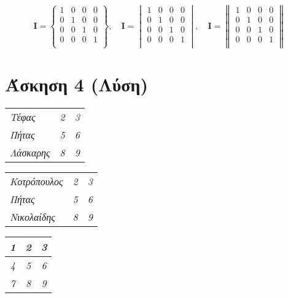 \documentclass[a4paper,11pt]{article}
\begin{document}
	\quad
	
	\begin{equation}
	\textbf{I} =
	\begin{Bmatrix} 
	1&0&0&0 \\
	0&1&0&0 \\
	0&0&1&0 \\
	0&0&0&1 \\
	\end{Bmatrix},\quad
	\textbf{I} =
	\begin{vmatrix} 
	1&0&0&0 \\
	0&1&0&0 \\
	0&0&1&0 \\
	0&0&0&1 \\
	\end{vmatrix},\quad
	\textbf{I} =
	\begin{Vmatrix} 
	1&0&0&0 \\
	0&1&0&0 \\
	0&0&1&0 \\
	0&0&0&1 \\
	\end{Vmatrix}
	\end{equation}

\vspace{20pt}

\section{Άσκηση 4 (Λύση)}
		
	\begin{table}[!h]
	\centering
	\begin{tabular}{ >{\em}l >{\em}c >{\em}c }
	Τέφας & 2 & 3 \\ 
	Πήτας & 5 & 6 \\ 
	Λάσκαρης & 8 & 9 \\ 
	\end{tabular}
	\end{table}	

	\begin{table}[!h]
	\centering
	\begin{tabular}{ | >{\em}l | >{\em}c | >{\em}c | }
	Κοτρόπουλος & 2 & 3 \\
	Πήτας & 5 & 6 \\ 
	Νικολαίδης & 8 & 9 \\ 
	\end{tabular}
	\end{table}		
	
	\begin{table}[!h]
	\centering
	\begin{tabular}{|>{\em}c|>{\em}c|>{\em}c|} \hline
	1 & 2 & 3 \\ \hline
	4 & 5 & 6 \\ \hline
	7 & 8 & 9 \\ \hline
	\end{tabular}
	\end{table}
	
\end{document}

